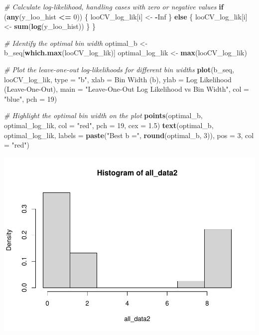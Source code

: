 \documentclass[
]{article}
\newenvironment{Shaded}{\begin{snugshade}}{\end{snugshade}}
\newcommand{\AttributeTok}[1]{\textcolor[rgb]{0.13,0.29,0.53}{#1}}
\newcommand{\CommentTok}[1]{\textcolor[rgb]{0.56,0.35,0.01}{\textit{#1}}}
\newcommand{\ConstantTok}[1]{\textcolor[rgb]{0.56,0.35,0.01}{#1}}
\newcommand{\ControlFlowTok}[1]{\textcolor[rgb]{0.13,0.29,0.53}{\textbf{#1}}}
\newcommand{\DecValTok}[1]{\textcolor[rgb]{0.00,0.00,0.81}{#1}}
\newcommand{\FloatTok}[1]{\textcolor[rgb]{0.00,0.00,0.81}{#1}}
\newcommand{\FunctionTok}[1]{\textcolor[rgb]{0.13,0.29,0.53}{\textbf{#1}}}
\newcommand{\NormalTok}[1]{#1}
\newcommand{\OtherTok}[1]{\textcolor[rgb]{0.56,0.35,0.01}{#1}}
\newcommand{\SpecialCharTok}[1]{\textcolor[rgb]{0.81,0.36,0.00}{\textbf{#1}}}
\newcommand{\StringTok}[1]{\textcolor[rgb]{0.31,0.60,0.02}{#1}}
\begin{document}
\begin{Shaded}
\begin{Highlighting}[]
  \CommentTok{\# Calculate log{-}likelihood, handling cases with zero or negative values}
  \ControlFlowTok{if}\NormalTok{ (}\FunctionTok{any}\NormalTok{(y\_loo\_hist }\SpecialCharTok{\textless{}=} \DecValTok{0}\NormalTok{)) \{}
\NormalTok{    looCV\_log\_lik[i] }\OtherTok{\textless{}{-}} \SpecialCharTok{{-}}\ConstantTok{Inf}
\NormalTok{  \} }\ControlFlowTok{else}\NormalTok{ \{}
\NormalTok{    looCV\_log\_lik[i] }\OtherTok{\textless{}{-}} \FunctionTok{sum}\NormalTok{(}\FunctionTok{log}\NormalTok{(y\_loo\_hist))}
\NormalTok{  \}}
\NormalTok{\}}

\CommentTok{\# Identify the optimal bin width}
\NormalTok{optimal\_b }\OtherTok{\textless{}{-}}\NormalTok{ b\_seq[}\FunctionTok{which.max}\NormalTok{(looCV\_log\_lik)]}
\NormalTok{optimal\_log\_lik }\OtherTok{\textless{}{-}} \FunctionTok{max}\NormalTok{(looCV\_log\_lik)}

\CommentTok{\# Plot the leave{-}one{-}out log{-}likelihoods for different bin widths}
\FunctionTok{plot}\NormalTok{(b\_seq, looCV\_log\_lik, }\AttributeTok{type =} \StringTok{"b"}\NormalTok{, }\AttributeTok{xlab =} \StringTok{\textquotesingle{}Bin Width (b)\textquotesingle{}}\NormalTok{, }\AttributeTok{ylab =} \StringTok{\textquotesingle{}Log Likelihood (Leave{-}One{-}Out)\textquotesingle{}}\NormalTok{,}
     \AttributeTok{main =} \StringTok{"Leave{-}One{-}Out Log Likelihood vs Bin Width"}\NormalTok{, }\AttributeTok{col =} \StringTok{"blue"}\NormalTok{, }\AttributeTok{pch =} \DecValTok{19}\NormalTok{)}

\CommentTok{\# Highlight the optimal bin width on the plot}
\FunctionTok{points}\NormalTok{(optimal\_b, optimal\_log\_lik, }\AttributeTok{col =} \StringTok{"red"}\NormalTok{, }\AttributeTok{pch =} \DecValTok{19}\NormalTok{, }\AttributeTok{cex =} \FloatTok{1.5}\NormalTok{)}
\FunctionTok{text}\NormalTok{(optimal\_b, optimal\_log\_lik, }\AttributeTok{labels =} \FunctionTok{paste}\NormalTok{(}\StringTok{"Best b ="}\NormalTok{, }\FunctionTok{round}\NormalTok{(optimal\_b, }\DecValTok{3}\NormalTok{)), }\AttributeTok{pos =} \DecValTok{3}\NormalTok{, }\AttributeTok{col =} \StringTok{"red"}\NormalTok{)}
\end{Highlighting}
\end{Shaded}

\includegraphics{Delivery1_files/figure-latex/unnamed-chunk-4-1.pdf}
\end{document}
